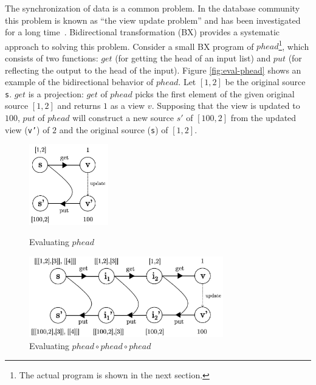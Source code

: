 The synchronization of data is a common problem. In the database community this problem is known as “the view update problem” and has been investigated for a long time~\cite{Bancilhon:1981:USR:319628.319634}. Bidirectional transformation (BX) provides a systematic approach to solving this problem.
Consider a small BX program of $phead$\footnote{The actual program is shown in the next section.}, which consists of two functions: $get$ (for getting the head of an input list) and $put$ (for reflecting the output to the head of the input). Figure \ref{fig:eval-phead} shows an example of the bidirectional behavior of $phead$.
Let $[1,2]$ be the original source \texttt{s}.
$get$ is a projection: $get$ of $phead$ picks the first element of the given original source $[1,2]$ and returns $1$ as a view $v$.
Supposing that the view is updated to $100$,
$put$ of $phead$ will construct a new source $s'$ of ${[100,2]}$ from the updated view (\texttt{v'}) of $2$ and the original source (\texttt{s}) of $[1,2]$.

\begin{figure}[!t]
  \begin{minipage}{0.3\textwidth}
    \centering
    \includegraphics[height=3.5cm]{./fig/fig1.eps}
    \caption{Evaluating $phead$}
    \label{fig:eval-phead}
  \end{minipage}\hfill
  \begin{minipage}{0.7\textwidth}
    \centering
    \includegraphics[height=3.5cm]{./fig/fig2.eps}
    \caption{Evaluating $phead \circ phead \circ phead$}
    \label{fig:eval-comp-phead}
  \end{minipage}
\end{figure}




